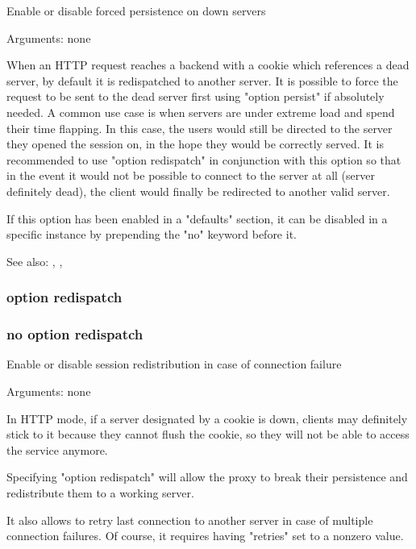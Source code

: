 
  Enable or disable forced persistence on down servers


  Arguments: none

  When an HTTP request reaches a backend with a cookie which references a dead
  server, by default it is redispatched to another server. It is possible to
  force the request to be sent to the dead server first using "option persist"
  if absolutely needed. A common use case is when servers are under extreme
  load and spend their time flapping. In this case, the users would still be
  directed to the server they opened the session on, in the hope they would be
  correctly served. It is recommended to use "option redispatch" in conjunction
  with this option so that in the event it would not be possible to connect to
  the server at all (server definitely dead), the client would finally be
  redirected to another valid server.

  If this option has been enabled in a "defaults" section, it can be disabled
  in a specific instance by prepending the "no" keyword before it.

  See also: , , 

\subsubsection[option redispatch]{option redispatch}
\subsubsection[no option redispatch]{no option redispatch}


  Enable or disable session redistribution in case of connection failure


  Arguments: none

  In HTTP mode, if a server designated by a cookie is down, clients may
  definitely stick to it because they cannot flush the cookie, so they will not
  be able to access the service anymore.

  Specifying "option redispatch" will allow the proxy to break their
  persistence and redistribute them to a working server.

  It also allows to retry last connection to another server in case of multiple
  connection failures. Of course, it requires having "retries" set to a nonzero
  value.

